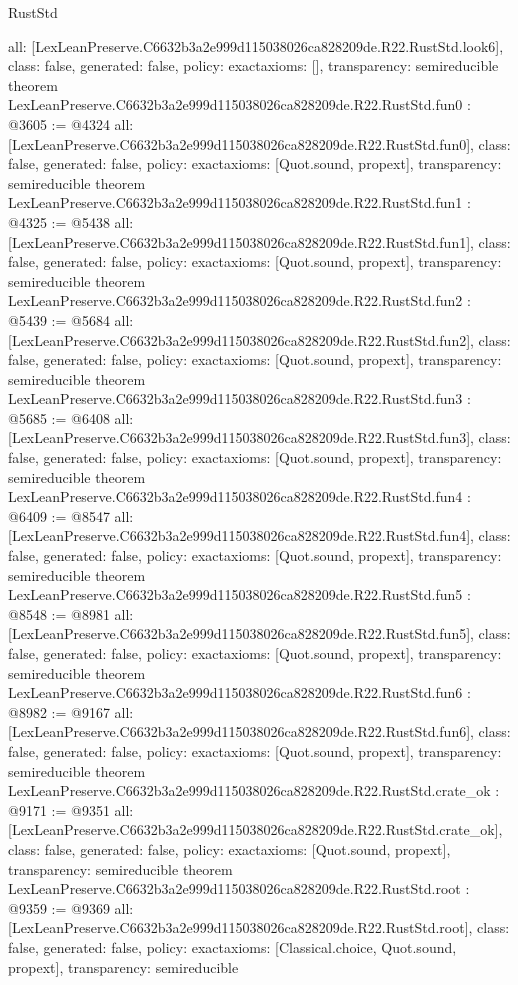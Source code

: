 \begin{lexlean}{RustStd}
\begin{coremodule}
{  all: [LexLeanPreserve.C6632b3a2e999d115038026ca828209de.R22.RustStd.look6],
  class: false,
  generated: false,
  policy: exact{axioms: []},
  transparency: semireducible
}
theorem LexLeanPreserve.C6632b3a2e999d115038026ca828209de.R22.RustStd.fun0 : @3605 := @4324 {
  all: [LexLeanPreserve.C6632b3a2e999d115038026ca828209de.R22.RustStd.fun0],
  class: false,
  generated: false,
  policy: exact{axioms: [Quot.sound, propext]},
  transparency: semireducible
}
theorem LexLeanPreserve.C6632b3a2e999d115038026ca828209de.R22.RustStd.fun1 : @4325 := @5438 {
  all: [LexLeanPreserve.C6632b3a2e999d115038026ca828209de.R22.RustStd.fun1],
  class: false,
  generated: false,
  policy: exact{axioms: [Quot.sound, propext]},
  transparency: semireducible
}
theorem LexLeanPreserve.C6632b3a2e999d115038026ca828209de.R22.RustStd.fun2 : @5439 := @5684 {
  all: [LexLeanPreserve.C6632b3a2e999d115038026ca828209de.R22.RustStd.fun2],
  class: false,
  generated: false,
  policy: exact{axioms: [Quot.sound, propext]},
  transparency: semireducible
}
theorem LexLeanPreserve.C6632b3a2e999d115038026ca828209de.R22.RustStd.fun3 : @5685 := @6408 {
  all: [LexLeanPreserve.C6632b3a2e999d115038026ca828209de.R22.RustStd.fun3],
  class: false,
  generated: false,
  policy: exact{axioms: [Quot.sound, propext]},
  transparency: semireducible
}
theorem LexLeanPreserve.C6632b3a2e999d115038026ca828209de.R22.RustStd.fun4 : @6409 := @8547 {
  all: [LexLeanPreserve.C6632b3a2e999d115038026ca828209de.R22.RustStd.fun4],
  class: false,
  generated: false,
  policy: exact{axioms: [Quot.sound, propext]},
  transparency: semireducible
}
theorem LexLeanPreserve.C6632b3a2e999d115038026ca828209de.R22.RustStd.fun5 : @8548 := @8981 {
  all: [LexLeanPreserve.C6632b3a2e999d115038026ca828209de.R22.RustStd.fun5],
  class: false,
  generated: false,
  policy: exact{axioms: [Quot.sound, propext]},
  transparency: semireducible
}
theorem LexLeanPreserve.C6632b3a2e999d115038026ca828209de.R22.RustStd.fun6 : @8982 := @9167 {
  all: [LexLeanPreserve.C6632b3a2e999d115038026ca828209de.R22.RustStd.fun6],
  class: false,
  generated: false,
  policy: exact{axioms: [Quot.sound, propext]},
  transparency: semireducible
}
theorem LexLeanPreserve.C6632b3a2e999d115038026ca828209de.R22.RustStd.crate_ok : @9171 := @9351 {
  all: [LexLeanPreserve.C6632b3a2e999d115038026ca828209de.R22.RustStd.crate_ok],
  class: false,
  generated: false,
  policy: exact{axioms: [Quot.sound, propext]},
  transparency: semireducible
}
theorem LexLeanPreserve.C6632b3a2e999d115038026ca828209de.R22.RustStd.root : @9359 := @9369 {
  all: [LexLeanPreserve.C6632b3a2e999d115038026ca828209de.R22.RustStd.root],
  class: false,
  generated: false,
  policy: exact{axioms: [Classical.choice, Quot.sound, propext]},
  transparency: semireducible
}


\end{coremodule}
\end{lexlean}

